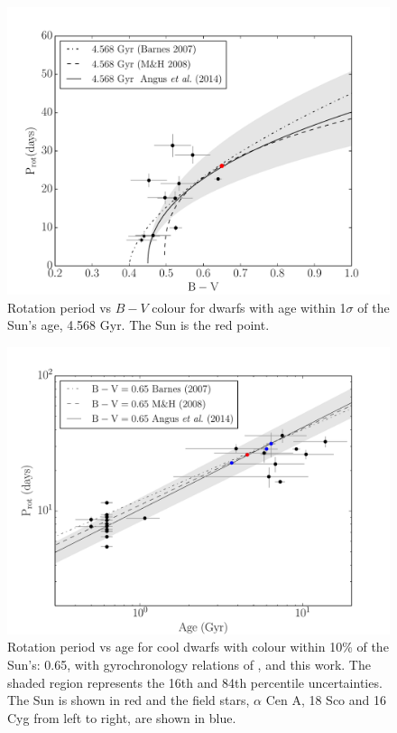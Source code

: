 \documentclass[11pt,preprint]{aastex}
\begin{document}
\begin{figure}[ht]
\begin{center}
\includegraphics[width=6in, clip=true, trim=0 0 0.5in 0]{p_vs_bv_solar.pdf}
\caption{Rotation period vs $B-V$ colour for dwarfs with age within 1$\sigma$ of the Sun's age, 4.568 Gyr. The Sun is the red point.
\label{fig:p_vs_bv_solar}}
\end{center}
\end{figure}

\begin{figure}[ht]
\begin{center}
\includegraphics[width=6in, clip=true, trim=0 0 0.5in 0]{p_vs_a_solar.pdf}
\caption{Rotation period vs age for cool dwarfs with colour within 10\% of the
	Sun's: 0.65, with gyrochronology relations of \citet{Barnes2007},
	\citet{Mamajek2008} and this work. The shaded region represents the
	16th and 84th percentile uncertainties. The Sun is shown in red and the
	field stars, $\alpha$ Cen A, 18 Sco and 16 Cyg from left to right, are
	shown in blue.
\label{fig:p_vs_a_solar}}
\end{center}
\end{figure}
\end{document}
